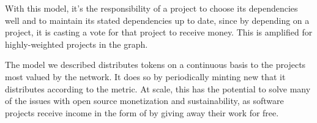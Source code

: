 With this model, it’s the responsibility of a project to choose its
dependencies well and to maintain its stated dependencies up to date, since by
depending on a project, it is casting a vote for that project to receive money.
This is amplified for highly-weighted projects in the graph.

The model we described distributes tokens on a continuous basis to the projects
most valued by the network. It does so by periodically minting new \oscoin{}
that it distributes according to the \osrank{} metric. At scale, this has the
potential to solve many of the issues with open source monetization and
sustainability, as software projects receive income in the form of \oscoin{}
by giving away their work for free.

